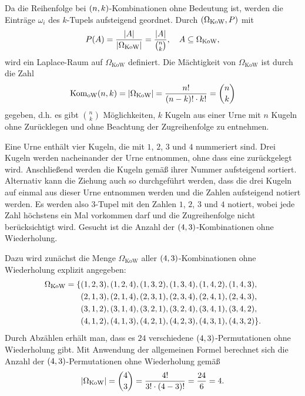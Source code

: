 \documentclass{lecture}
\begin{document}
    Da die Reihenfolge bei \(\parentheses*{n, k}\)-Kombinationen ohne Bedeutung ist, werden die Einträge \(\omega_i\) des \(k\)-Tupels aufsteigend geordnet.
    Durch \(\parentheses*{\Omega_{\text{KoW}}, P}\) mit
    \[
        P\parentheses*{A} = \frac{\absolute*{A}}{\absolute*{\Omega_{\text{KoW}}}} = \frac{\absolute*{A}}{\binom{n}{k}}, \quad A \subseteq \Omega_{\text{KoW}},
    \]
    wird ein Laplace-Raum auf \(\Omega_{\text{KoW}}\) definiert.
    Die Mächtigkeit von \(\Omega_{\text{KoW}}\) ist durch die Zahl
    \[
        \Kom_{\text{oW}}\parentheses*{n, k} = \absolute*{\Omega_{\text{KoW}}} = \frac{n!}{\parentheses*{n - k}! \cdot k!} = \binom{n}{k}
    \]
    gegeben, d.h. es gibt \(\binom{n}{k}\) Möglichkeiten, \(k\) Kugeln aus einer Urne mit \(n\) Kugeln ohne Zurücklegen und ohne Beachtung der Zugreihenfolge zu entnehmen.

    \begin{example}
        Eine Urne enthält vier Kugeln, die mit \(1\), \(2\), \(3\) und \(4\) nummeriert sind.
        Drei Kugeln werden nacheinander der Urne entnommen, ohne dass eine zurückgelegt wird.
        Anschließend werden die Kugeln gemäß ihrer Nummer aufsteigend sortiert.
        Alternativ kann die Ziehung auch so durchgeführt werden, dass die drei Kugeln auf einmal aus dieser Urne entnommen werden und die Zahlen aufsteigend notiert werden.
        Es werden also \(3\)-Tupel mit den Zahlen \(1\), \(2\), \(3\) und \(4\) notiert, wobei jede Zahl höchstens ein Mal vorkommen darf und die Zugreihenfolge nicht berücksichtigt wird.
        Gesucht ist die Anzahl der \(\parentheses*{4, 3}\)-Kombinationen ohne Wiederholung.

        Dazu wird zunächst die Menge \(\Omega_{\text{KoW}}\) aller \(\parentheses*{4, 3}\)-Kombinationen ohne Wiederholung explizit angegeben:
        \begin{align*}
            \Omega_{\text{KoW}} = \{&\parentheses*{1, 2, 3}, \parentheses*{1, 2, 4}, \parentheses*{1, 3, 2}, \parentheses*{1, 3, 4}, \parentheses*{1, 4, 2}, \parentheses*{1, 4, 3},\\
            &\parentheses*{2, 1, 3}, \parentheses*{2, 1, 4}, \parentheses*{2, 3, 1}, \parentheses*{2, 3, 4}, \parentheses*{2, 4, 1}, \parentheses*{2, 4, 3},\\
            &\parentheses*{3, 1, 2}, \parentheses*{3, 1, 4}, \parentheses*{3, 2, 1}, \parentheses*{3, 2, 4}, \parentheses*{3, 4, 1}, \parentheses*{3, 4, 2},\\
            &\parentheses*{4, 1, 2}, \parentheses*{4, 1, 3}, \parentheses*{4, 2, 1}, \parentheses*{4, 2, 3}, \parentheses*{4, 3, 1}, \parentheses*{4, 3, 2}\}.
        \end{align*}
        Durch Abzählen erhält man, dass es \(24\) verschiedene \(\parentheses*{4, 3}\)-Permutationen ohne Wiederholung gibt.
        Mit Anwendung der allgemeinen Formel berechnet sich die Anzahl der \(\parentheses*{4, 3}\)-Permutationen ohne Wiederholung gemäß
        \[
            \absolute*{\Omega_{\text{KoW}}} = \binom{4}{3} = \frac{4!}{3! \cdot \parentheses*{4 - 3}!} = \frac{24}{6} = 4.
        \]
    \end{example}
\end{document}
